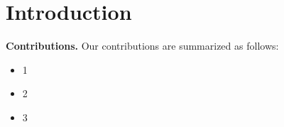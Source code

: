 \section{Introduction}




\textbf{ Contributions.} Our contributions are summarized as follows:
\begin{itemize}
\item 1
\item 2
\item 3
\end{itemize} 
